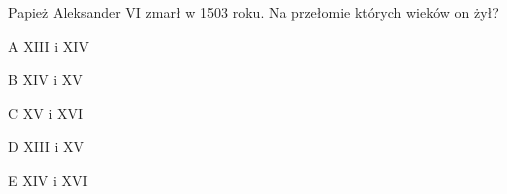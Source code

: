 \begin{tresc}
Papież Aleksander VI zmarł w 1503 roku. Na przełomie których wieków on żył?
\end{tresc}
\begin{wariant}{A} XIII i XIV \end{wariant}
\begin{wariant}{B} XIV i XV \end{wariant}
\begin{wariant}{C} XV i XVI \end{wariant}
\begin{wariant}{D} XIII i XV \end{wariant}
\begin{wariant}{E} XIV i XVI \end{wariant}
